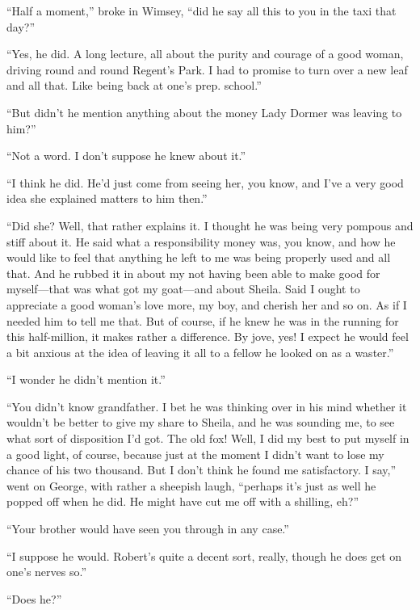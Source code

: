 \enquote{Half a moment,} broke in Wimsey, \enquote{did he say all this to you in the taxi that day?}

\enquote{Yes, he did. A long lecture, all about the purity and courage of a good woman, driving round and round Regent's Park. I had to promise to turn over a new leaf and all that. Like being back at one's prep. school.}

\enquote{But didn't he mention anything about the money Lady Dormer was leaving to him?}

\enquote{Not a word. I don't suppose he knew about it.}

\enquote{I think he did. He'd just come from seeing her, you know, and I've a very good idea she explained matters to him then.}

\enquote{Did she? Well, that rather explains it. I thought he was being very pompous and stiff about it. He said what a responsibility money was, you know, and how he would like to feel that anything he left to me was being properly used and all that. And he rubbed it in about my not having been able to make good for myself\allowbreak---\allowbreak that was what got my goat\allowbreak---\allowbreak and about Sheila. Said I ought to appreciate a good woman's love more, my boy, and cherish her and so on. As if I needed him to tell me that. But of course, if he knew he was in the running for this half-million, it makes rather a difference. By jove, yes! I expect he would feel a bit anxious at the idea of leaving it all to a fellow he looked on as a waster.}

\enquote{I wonder he didn't mention it.}

\enquote{You didn't know grandfather. I bet he was thinking over in his mind whether it wouldn't be better to give my share to Sheila, and he was sounding me, to see what sort of disposition I'd got. The old fox! Well, I did my best to put myself in a good light, of course, because just at the moment I didn't want to lose my chance of his two thousand. But I don't think he found me satisfactory. I say,} went on George, with rather a sheepish laugh, \enquote{perhaps it's just as well he popped off when he did. He might have cut me off with a shilling, eh?}

\enquote{Your brother would have seen you through in any case.}

\enquote{I suppose he would. Robert's quite a decent sort, really, though he does get on one's nerves so.}

\enquote{Does he?}

